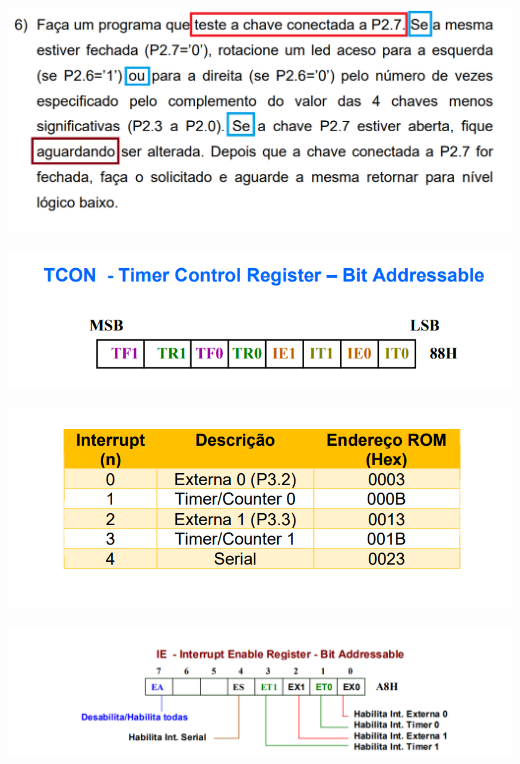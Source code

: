 \documentclass[12pt,a4paper,aspectratio=169]{beamer}
\begin{document}
\begin{frame}
	\includegraphics[scale = 0.5]{imagens/exemplo6.PNG}
\end{frame}

\begin{frame}
	\includegraphics[scale = 0.5]{imagens/TCON.PNG}
\end{frame}

\begin{frame}
	\includegraphics[scale = 0.5]{imagens/interrupts.PNG}
\end{frame}

\begin{frame}
	\includegraphics[scale = 0.5]{imagens/IE.PNG}
\end{frame}
\end{document}
